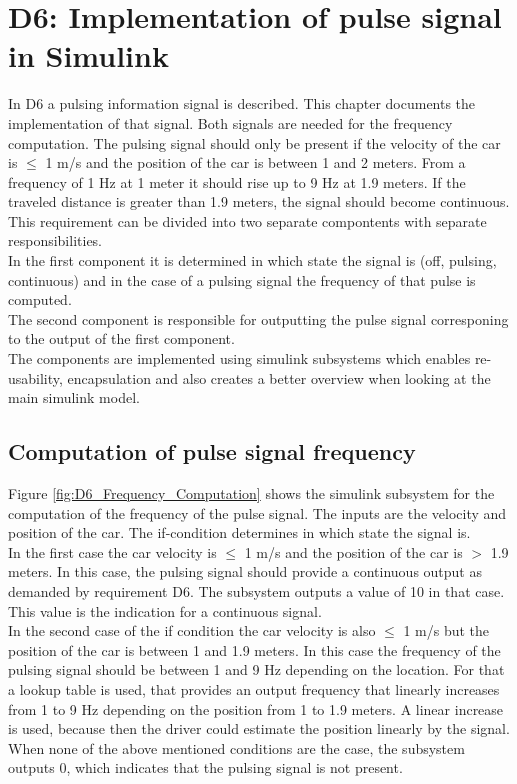 \chapter{D6: Implementation of pulse signal in Simulink}\label{cha:D6}

In D6 a pulsing information signal is described. This chapter documents the implementation of that signal.
Both signals are needed for the frequency computation.
The pulsing signal should only be present if the velocity of the car is $\leq$ 1 m/s and the position of the car is between 1 and 2 meters. From a frequency of 1 Hz at 1 meter it should rise up to 9 Hz at 1.9 meters. If the traveled distance is greater than 1.9 meters, the signal should become continuous.\\
This requirement can be divided into two separate compontents with separate responsibilities.\\
In the first component it is determined in which state the signal is (off, pulsing, continuous) and in the case of a pulsing signal the frequency of that pulse is computed.\\
The second component is responsible for outputting the pulse signal corresponing to the output of the first component.\\
The components are implemented using simulink subsystems which enables re-usability, encapsulation and also creates a better overview when looking at the main simulink model.\\
\section{Computation of pulse signal frequency}\label{sec:D6Frequency}
Figure \ref{fig:D6_Frequency_Computation} shows the simulink subsystem for the computation of the frequency of the pulse signal.
The inputs are the velocity and position of the car.
The if-condition determines in which state the signal is.\\
In the first case the car velocity is $\leq$ 1 m/s and the position of the car is $>$ 1.9 meters.
In this case, the pulsing signal should provide a continuous output as demanded by requirement D6.
The subsystem outputs a value of 10 in that case.
This value is the indication for a continuous signal.\\
In the second case of the if condition the car velocity is also $\leq$ 1 m/s but the position of the car is between 1 and 1.9 meters.
In this case the frequency of the pulsing signal should be between 1 and 9 Hz depending on the location.
For that a lookup table is used, that provides an output frequency that linearly increases from 1 to 9 Hz depending on the position from 1 to 1.9 meters. A linear increase is used, because then the driver could estimate the position linearly by the signal.\\
When none of the above mentioned conditions are the case, the subsystem outputs 0, which indicates that the pulsing signal is not present.

